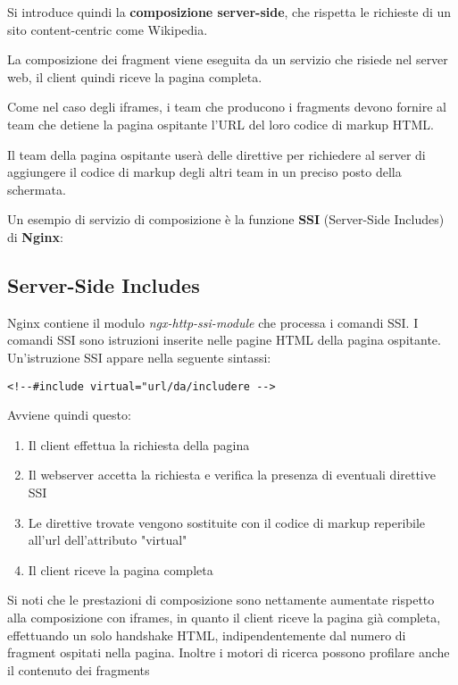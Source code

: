 Si introduce quindi la \textbf{composizione server-side}, che rispetta le richieste di un sito content-centric come Wikipedia.

La composizione dei fragment viene eseguita da un servizio che risiede nel server web, il client quindi riceve la pagina completa.

Come nel caso degli iframes, i team che producono i fragments devono fornire al team che detiene la pagina ospitante l'URL del loro codice di markup HTML.

Il team della pagina ospitante userà delle direttive 
per richiedere al server di aggiungere il codice di markup degli altri team in un preciso posto della schermata.

Un esempio di servizio di composizione è la funzione \textbf{SSI} (Server-Side Includes) di \textbf{Nginx}:

\subsection{Server-Side Includes}

Nginx contiene il modulo \emph{ngx-http-ssi-module} che processa i comandi SSI.
 I comandi SSI sono istruzioni
inserite nelle pagine HTML della pagina ospitante. Un'istruzione SSI appare nella seguente sintassi:

   \begin{center}
    \verb|<!--#include virtual="url/da/includere -->|
   \end{center}

Avviene quindi questo:

\begin{enumerate}
    \item Il client effettua la richiesta della pagina
    \item Il webserver accetta la richiesta e verifica la presenza di eventuali direttive SSI
    \item Le direttive trovate vengono sostituite con il codice di markup reperibile all'url dell'attributo "virtual"
    \item Il client riceve la pagina completa
\end{enumerate}

Si noti che le prestazioni di composizione sono nettamente aumentate rispetto alla composizione con iframes, 
in quanto il client riceve la pagina già completa, effettuando un solo handshake HTML, indipendentemente dal numero
di fragment ospitati nella pagina. Inoltre i motori di ricerca possono profilare anche il contenuto dei fragments

